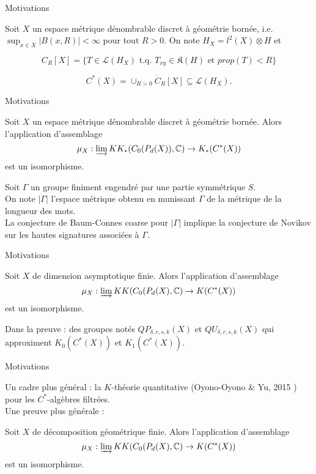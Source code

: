 \begin{frame}{Motivations}

Soit $X$ un espace métrique dénombrable discret à géométrie bornée, i.e. $\sup_{x\in X} |B(x,R)|<\infty$ pour tout $R>0$. On note $H_X = l^2(X)\otimes H$ et 

\[C_R[X] = \{T\in \mathcal L(H_X) \text{ t.q. } T_{xy} \in \mathfrak K(H) \text{ et } prop(T) < R \}\]

\begin{definitionfr}
\[C^*(X) = \overline{\cup_{R>0} C_R[X]} \subseteq \mathcal L(H_X).\]
\end{definitionfr}
\end{frame}

\begin{frame}{Motivations}
\begin{conj}
Soit $X$ un espace métrique dénombrable discret à géométrie bornée. Alors l'application d'assemblage
\[\mu_X : \varinjlim KK_*(C_0(P_d(X)),\mathbb C) \rightarrow K_*(C^*(X))\]
est un isomorphisme.
\end{conj}

Soit $\Gamma$ un groupe finiment engendré par une partie symmétrique $S$. \\
\vspace{0.3 cm}
On note $|\Gamma|$ l'espace métrique obtenu en munissant $\Gamma$ de la métrique de la longueur des mots. \\
\vspace{0.3 cm}
La conjecture de Baum-Connes coarse pour $|\Gamma |$ implique la conjecture de Novikov sur les hautes signatures associées à $\Gamma$. 
\end{frame}

\begin{frame}{Motivations}

\begin{thmfr}[Yu, 2010 \cite{Yu1}]
Soit $X$ de dimension asymptotique finie. Alors l'application d'assemblage
\[\mu_X : \varinjlim KK(C_0(P_d(X),\mathbb C) \rightarrow K(C^*(X))\]
est un isomorphisme.
\end{thmfr}

Dans la preuve : des groupes notés $QP_{\delta, r ,s, k}(X)$ et $QU_{\delta, r ,s, k}(X)$ qui approximent $K_0(C^*(X))$ et $K_1(C^*(X))$.\\

\end{frame}

\begin{frame}{Motivations}

Un cadre plus général : la $K$-théorie quantitative (Oyono-Oyono \& Yu, 2015 \cite{OY2}) pour les $C^*$-algèbres filtrées.\\
\vspace{0.3 cm}
Une preuve plus générale :

\begin{thmfr}
Soit $X$ de décomposition géométrique finie. Alors l'application d'assemblage
\[\mu_X : \varinjlim KK(C_0(P_d(X),\mathbb C) \rightarrow K(C^*(X))\]
est un isomorphisme.
\end{thmfr}

\end{frame}

